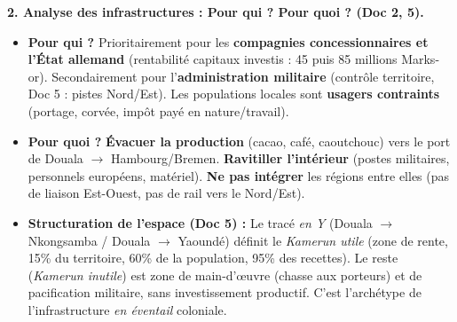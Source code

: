 \documentclass[11pt]{article}
\begin{document}
\begin{exoresolu}
\medskip
\textbf{2. Analyse des infrastructures : Pour qui ? Pour quoi ? (Doc 2, 5).}
\begin{itemize}
    \item \textbf{Pour qui ?} Prioritairement pour les \textbf{compagnies concessionnaires et l'État allemand} (rentabilité capitaux investis : 45 puis 85 millions Marks-or). Secondairement pour l'\textbf{administration militaire} (contrôle territoire, Doc 5 : pistes Nord/Est). Les populations locales sont \textbf{usagers contraints} (portage, corvée, impôt payé en nature/travail).
    \item \textbf{Pour quoi ?} \textbf{Évacuer la production} (cacao, café, caoutchouc) vers le port de Douala $\rightarrow$ Hambourg/Bremen. \textbf{Ravitiller l'intérieur} (postes militaires, personnels européens, matériel). \textbf{Ne pas intégrer} les régions entre elles (pas de liaison Est-Ouest, pas de rail vers le Nord/Est).
    \item \textbf{Structuration de l'espace (Doc 5) :} Le tracé \emph{en Y} (Douala $\rightarrow$ Nkongsamba / Douala $\rightarrow$ Yaoundé) définit le \emph{Kamerun utile} (zone de rente, 15\% du territoire, 60\% de la population, 95\% des recettes). Le reste (\emph{Kamerun inutile}) est zone de main-d'œuvre (chasse aux porteurs) et de pacification militaire, sans investissement productif. C'est l'archétype de l'infrastructure \emph{en éventail} coloniale.
\end{itemize}


\end{exoresolu}
\end{document}
